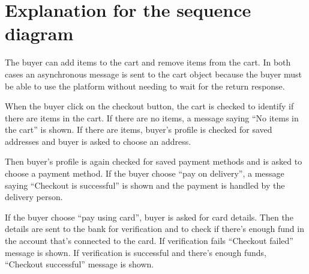 \documentclass{article}
\begin{document}
    \section{Explanation for the sequence diagram}\label{sec:exp}
    The buyer can add items to the cart and remove items from the cart.
    In both cases an asynchronous message is sent to the cart object because the buyer must be able to use the platform without needing to wait for the return response.

    When the buyer click on the checkout button, the cart is checked to identify if there are items in the cart.
    If there are no items, a message saying ``No items in the cart'' is shown.
    If there are items, buyer's profile is checked for saved addresses and buyer is asked to choose an address.

    Then buyer's profile is again checked for saved payment methods and is asked to choose a payment method.
    If the buyer choose ``pay on delivery'', a message saying ``Checkout is successful'' is shown and the payment is handled by the delivery person.

    If the buyer choose ``pay using card'', buyer is asked for card details.
    Then the details are sent to the bank for verification and to check if there's enough fund in the account that's connected to the card.
    If verification fails ``Checkout failed'' message is shown.
    If verification is successful and there's enough funds, ``Checkout successful'' message is shown.
\end{document}
